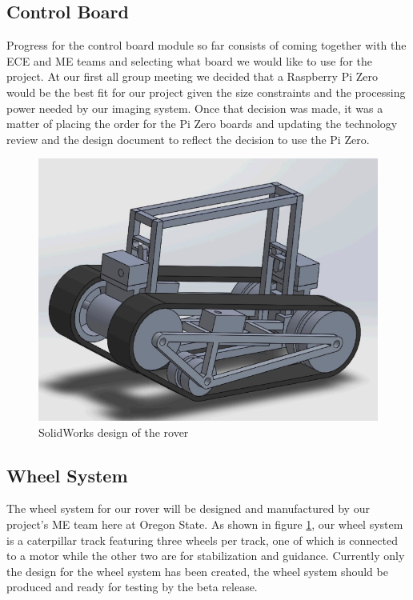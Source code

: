 \documentclass[10pt,letterpaper,onecolumn,draftclsnofoot,journal]{IEEEtran}
\begin{document}
\subsection{Control Board}
Progress for the control board module so far consists of coming together with the ECE and ME teams and selecting what board we would like to use for the project. At our first all group meeting we decided that a Raspberry Pi Zero would be the best fit for our project given the size constraints and the processing power needed by our imaging system. Once that decision was made, it was a matter of placing the order for the Pi Zero boards and updating the technology review and the design document to reflect the decision to use the Pi Zero.
\begin{figure}[h!]
	\includegraphics[scale = .4]{capture.png}
	\caption{SolidWorks design of the rover}
	\label{fig:rover}
\end{figure}
\subsection{Wheel System}
The wheel system for our rover will be designed and manufactured by our project's ME team here at Oregon State. As shown in figure \ref{fig:rover}, our wheel system is a caterpillar track featuring three wheels per track, one of which is connected to a motor while the other two are for stabilization and guidance. Currently only the design for the wheel system has been created, the wheel system should be produced and ready for testing by the beta release.
\end{document}
